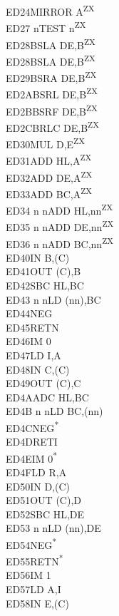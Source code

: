 \documentclass[oneside,a4paper]{book}
\begin{document}
\begin{multicols}{3}
{\begin{tabbing}
ED24\>MIRROR A\textsuperscript{ZX}\\
ED27 n\>TEST n\textsuperscript{ZX}\\
ED28\>BSLA DE,B\textsuperscript{ZX}\\
ED28\>BSLA DE,B\textsuperscript{ZX}\\
ED29\>BSRA DE,B\textsuperscript{ZX}\\
ED2A\>BSRL DE,B\textsuperscript{ZX}\\
ED2B\>BSRF DE,B\textsuperscript{ZX}\\
ED2C\>BRLC DE,B\textsuperscript{ZX}\\
ED30\>MUL D,E\textsuperscript{ZX}\\
ED31\>ADD HL,A\textsuperscript{ZX}\\
ED32\>ADD DE,A\textsuperscript{ZX}\\
ED33\>ADD BC,A\textsuperscript{ZX}\\
ED34 n n\>ADD HL,nn\textsuperscript{ZX}\\
ED35 n n\>ADD DE,nn\textsuperscript{ZX}\\
ED36 n n\>ADD BC,nn\textsuperscript{ZX}\\
ED40\>IN B,(C)\\
ED41\>OUT (C),B\\
ED42\>SBC HL,BC\\
ED43 n n\>LD (nn),BC\\
ED44\>NEG\\
ED45\>RETN\\
ED46\>IM 0\\
ED47\>LD I,A\\
ED48\>IN C,(C)\\
ED49\>OUT (C),C\\
ED4A\>ADC HL,BC\\
ED4B n n\>LD BC,(nn)\\
ED4C\>NEG\textsuperscript{*}\\
ED4D\>RETI\\
ED4E\>IM 0\textsuperscript{*}\\
ED4F\>LD R,A\\
ED50\>IN D,(C)\\
ED51\>OUT (C),D\\
ED52\>SBC HL,DE\\
ED53 n n\>LD (nn),DE\\
ED54\>NEG\textsuperscript{*}\\
ED55\>RETN\textsuperscript{*}\\
ED56\>IM 1\\
ED57\>LD A,I\\
ED58\>IN E,(C)\\

\end{tabbing}}
\end{multicols}
\end{document}
